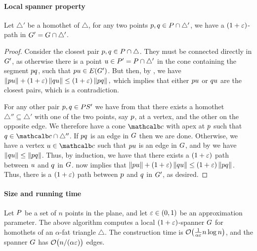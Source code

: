 \documentclass[12pt]{article}%
\begin{document}
\paragraph{Local spanner property}
\begin{lemma}
    Let $\triangle'$ be a homothet of $\triangle$, for any two points
    $p, q \in P \cap \triangle'$, we have a $(1+\varepsilon)$-path in
    $G' = G \cap {\triangle'}$.
\end{lemma}



\begin{proof}
    Consider the closest pair $p,q \in P \cap \triangle$. They
    must be connected directly in $G'$, as otherwise there is a point
    $u \in P' = P \cap \triangle'$ in the cone containing the
    segment $pq$, such that $\pa \pc \in \EGX{\G'}$. But then, by
    , we have
        \begin{math}
        \dY{\pa}{\pc}%
        +%
        (1+\eps)\dY{\pb}{\pc}%
        \leq%
        (1+\eps)\dY{\pa}{\pb},
    \end{math}
    which implies that either $pu$ or $qu$ are the closest
    pairs, which is a contradiction.

    
    For any other pair $p,q\in PS'$ we have from
     that there exists a homothet
    $\triangle''\subseteq \triangle'$ with one of the two points, say
    $p$, at a vertex, and the other on the opposite edge. We
    therefore have a cone $\cone$ with apex at $p$ such that
    $\pb\in \cone\cap \triangle''$. If $pq$ is an edge in $G$
    then we are done. Otherwise, we have a vertex $\pc\in \cone$ such
    that $pu$ is an edge in $G$, and by
     we have
    $\left\| q u \right\|\leq \left\| p q \right\|$. Thus, by induction, we have
    that there exists a $(1+\varepsilon)$ path between $u$ and $q$ in
    $G$.  now implies that
    $\left\| p u \right\|+(1+\varepsilon)\left\| q u \right\|\leq(1+\varepsilon)\left\| p q \right\|$. Thus,
    there is a $(1+\varepsilon)$ path between $p$ and $q$ in $G'$, as
    desired.
\end{proof}
 


\paragraph{Size and running time}


\begin{theorem}
    Let $P$ be a set of $n$ points in the plane, and let
    $\varepsilon \in (0,1)$ be an approximation parameter. The above
    algorithm computes a local $(1+\varepsilon)$-spanner $G$ for homothets
    of an $\alpha$-fat triangle $\triangle$.  The construction time is
    $\Of\pth{\frac{1}{\alpha\eps}n\log n}$, and the spanner $G$ has
    $\Of\pth{ n / (\alpha\eps) \bigr.}$ edges.
\end{theorem}
\end{document}
